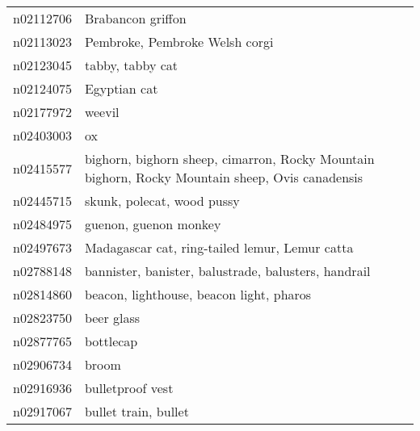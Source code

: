 \begin{appendices}
{\begin{footnotesize}
\begin{longtabu}{X|X[4]}
    		n02112706 &                                                                                                          Brabancon griffon \tabularnewline
    		n02113023 &                                                                                             Pembroke, Pembroke Welsh corgi \tabularnewline
    		n02123045 &                                                                                                           tabby, tabby cat \tabularnewline
    		n02124075 &                                                                                                               Egyptian cat \tabularnewline
    		n02177972 &                                                                                                                     weevil \tabularnewline
    		n02403003 &                                                                                                                         ox \tabularnewline
    		n02415577 &                            bighorn, bighorn sheep, cimarron, Rocky Mountain bighorn, Rocky Mountain sheep, Ovis canadensis \tabularnewline
    		n02445715 &                                                                                                 skunk, polecat, wood pussy \tabularnewline
    		n02484975 &                                                                                                      guenon, guenon monkey \tabularnewline
    		n02497673 &                                                                             Madagascar cat, ring-tailed lemur, Lemur catta \tabularnewline
    		n02788148 &                                                                       bannister, banister, balustrade, balusters, handrail \tabularnewline
    		n02814860 &                                                                                   beacon, lighthouse, beacon light, pharos \tabularnewline
    		n02823750 &                                                                                                                 beer glass \tabularnewline
    		n02877765 &                                                                                                                  bottlecap \tabularnewline
    		n02906734 &                                                                                                                      broom \tabularnewline
    		n02916936 &                                                                                                           bulletproof vest \tabularnewline
    		n02917067 &                                                                                                       bullet train, bullet \tabularnewline

\end{longtabu}
\end{footnotesize}}
\end{appendices}
